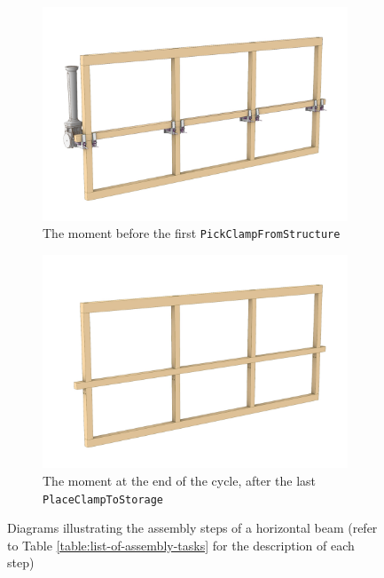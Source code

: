 \begin{figure}[p]
\begin{subfigure}[b]{0.49\textwidth}
        \includegraphics[width=\textwidth]{images/04-1+2/Multiple_11.jpg}
        \caption{The moment before the first {\tt PickClampFromStructure}}
        \label{fig:fig:beam-assembly-step5}
    \end{subfigure}
    \hfill
    \begin{subfigure}[b]{0.49\textwidth}
        \centering
        \includegraphics[width=\textwidth]{images/04-1+2/Multiple_15.jpg}
        \caption{The moment at the end of the cycle, after the last {\tt PlaceClampToStorage}}
        \label{fig:fig:beam-assembly-step6}
    \end{subfigure}
    \caption[Diagrams illustrating the assembly steps of a horizontal beam]
    {Diagrams illustrating the assembly steps of a horizontal beam (refer to Table \ref{table:list-of-assembly-tasks} for the description of each step)}
    \label{fig:beam-assembly-six-moments}
\end{figure}

